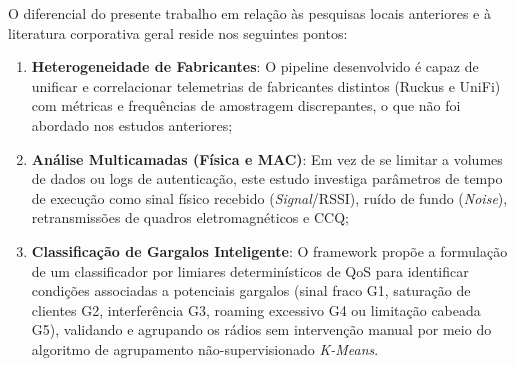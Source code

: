 O diferencial do presente trabalho em relação às pesquisas locais anteriores e à literatura corporativa geral reside nos seguintes pontos:
\begin{enumerate}
	\item \textbf{Heterogeneidade de Fabricantes}: O pipeline desenvolvido é capaz de unificar e correlacionar telemetrias de fabricantes distintos (Ruckus e UniFi) com métricas e frequências de amostragem discrepantes, o que não foi abordado nos estudos anteriores;
	\item \textbf{Análise Multicamadas (Física e MAC)}: Em vez de se limitar a volumes de dados ou logs de autenticação, este estudo investiga parâmetros de tempo de execução como sinal físico recebido (\textit{Signal}/RSSI), ruído de fundo (\textit{Noise}), retransmissões de quadros eletromagnéticos e CCQ;
	\item \textbf{Classificação de Gargalos Inteligente}: O framework propõe a formulação de um classificador por limiares determinísticos de QoS para identificar condições associadas a potenciais gargalos (sinal fraco G1, saturação de clientes G2, interferência G3, roaming excessivo G4 ou limitação cabeada G5), validando e agrupando os rádios sem intervenção manual por meio do algoritmo de agrupamento não-supervisionado \textit{K-Means}.
\end{enumerate}